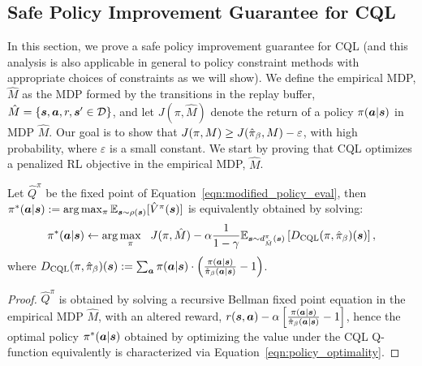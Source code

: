\subsection{Safe Policy Improvement Guarantee for CQL}
\label{app:safe_pi}
In this section, we prove a safe policy improvement guarantee for CQL (and this analysis is also applicable in general to policy constraint methods with appropriate choices of constraints as we will show). We define the empirical MDP, $\hat{M}$ as the MDP formed by the transitions in the replay buffer, $\hat{M} = \{\boldsymbol{s}, \boldsymbol{a}, r, \boldsymbol{s}' \in \mathcal{D} \}$, and let $J(\pi, \hat{M})$ denote the return of a policy $\pi(\boldsymbol{a}|\boldsymbol{s})$ in MDP $\hat{M}$. Our goal is to show that $J(\pi, M) \geq J(\hat{\pi}_\beta, M) - \varepsilon$, with high probability, where $\varepsilon$ is a small constant. We start by proving that CQL optimizes a penalized RL objective in the empirical MDP, $\hat{M}$.

\begin{lemma}
Let $\hat{Q}^\pi$ be the fixed point of Equation~\ref{eqn:modified_policy_eval}, then $\pi^*(\boldsymbol{a}|\boldsymbol{s}) := \arg\max_{\pi} \mathbb{E}_{\boldsymbol{s} \sim \rho(\boldsymbol{s})}[\hat{V}^\pi(\boldsymbol{s})]$ is equivalently obtained by solving:
\begin{equation}
\label{eqn:policy_optimality}
    \pi^*(\boldsymbol{a}|\boldsymbol{s}) \leftarrow \arg \max_{\pi}~~ J(\pi, \hat{M}) - \alpha \frac{1}{1 - \gamma} \mathbb{E}_{\boldsymbol{s} \sim d^\pi_{\hat{M}}(\boldsymbol{s})}\left[D_{\text{CQL}}(\pi, \hat{\pi}_\beta)(\boldsymbol{s}) \right],
\end{equation}
where $D_{\text{CQL}}(\pi, \hat{\pi}_\beta)(\boldsymbol{s}) := \sum_{\boldsymbol{a}} \pi(\boldsymbol{a}|\boldsymbol{s}) \cdot \left(\frac{\pi(\boldsymbol{a}|\boldsymbol{s})}{\hat{\pi}_\beta(\boldsymbol{a}|\boldsymbol{s})} - 1 \right)$.
\end{lemma}
\begin{proof}
$\hat{Q}^\pi$ is obtained by solving a recursive Bellman fixed point equation in the empirical MDP $\hat{M}$, with an altered reward, $r(\boldsymbol{s}, \boldsymbol{a}) - \alpha \left[ \frac{\pi(\boldsymbol{a}|\boldsymbol{s})}{\hat{\pi}_\beta(\boldsymbol{a}|\boldsymbol{s})} - 1 \right]$, hence the optimal policy $\pi^*(\boldsymbol{a}|\boldsymbol{s})$ obtained by optimizing the value under the CQL Q-function equivalently is characterized via Equation~\ref{eqn:policy_optimality}.
\end{proof}

